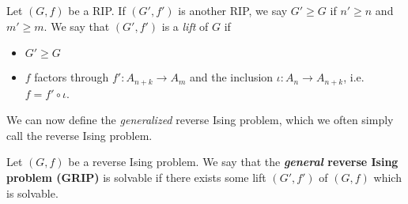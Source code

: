 \begin{defn}\label{defn:rev-ising-lift}
	Let $(G,f)$ be a RIP. If $(G',f')$ is another RIP, we say $G' \geq G$ if $n'\geq n$ and $m'\geq m$. We say that $(G',f')$ is a \emph{lift} of $G$ if 
	\begin{itemize}
		\item $G' \geq G$
		\item $f$ factors through $f':A_{n+k}\to A_m$ and the inclusion $\iota:A_n\to A_{n+k}$, i.e. $f = f'\circ \iota$.
	\end{itemize}
\end{defn}
We can now define the \emph{generalized} reverse Ising problem, which we often simply call the reverse Ising problem.
\begin{problem}\label{prop:gen-rev-ising}
	Let $(G,f)$ be a reverse Ising problem. We say that the \textbf{\emph{general} reverse Ising problem (GRIP)} is solvable if there exists some lift $(G',f')$ of $(G,f)$ which is solvable.
\end{problem}


